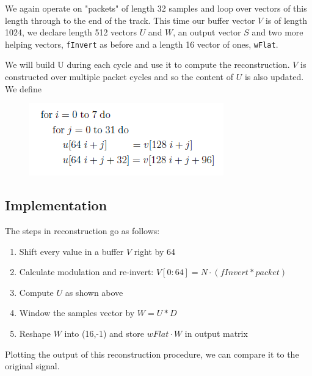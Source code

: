 \documentclass[11pt,a4paper]{article}
\begin{document}
We again operate on "packets" of length 32 samples and loop over vectors of this length through to the end of the track. This time our buffer vector $V$ is of length 1024, we declare length 512 vectors $U$ and $W$, an output vector $S$ and two more helping vectors, \verb|fInvert| as before and a length 16 vector of ones, \verb|wFlat|.

We will build U during each cycle and use it to compute the reconstruction. $V$ is constructed over multiple packet cycles and so the content of $U$ is also updated. We define

\begin{figure}[ht]
	\centering
	\includegraphics[scale=1]{synthesis/u_vect}
\end{figure}

\subsection{Implementation}

The steps in reconstruction go as follows:

\begin{enumerate}
\item Shift every value in a buffer $V$ right by 64
\item Calculate modulation and re-invert: $V[0:64] = N \cdot (fInvert * packet)$
\item Compute $U$ as shown above
\item Window the samples vector by $W = U * D$
\item Reshape $W$ into (16,-1) and store $wFlat \cdot W$ in output matrix
\end{enumerate}

Plotting the output of this reconstruction procedure, we can compare it to the original signal.
\end{document}
